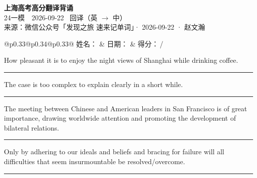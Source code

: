 \documentclass[11pt,a4paper]{article}
\newcommand{\num}[1]{\makebox[1.9em][r]{#1.}\hspace{0.3em}}
\newcommand{\wline}{\noindent\rule{\linewidth}{0.4pt}}
\begin{document}
\pagestyle{plain}
\begin{center}
{\LARGE\bfseries 上海高考高分翻译背诵 }\\[0.25em]
{\large 24一模　2026-09-22 \quad\ 回译（英 $\to$ 中）}\\[0.35em]
{\footnotesize 来源：微信公众号「发现之旅 速来记单词」· 2026-09-22 · 赵文瀚}
\end{center}

\vspace{0.4em}
\noindent\begin{tabular}{@{}p{0.33\textwidth}@{}p{0.34\textwidth}@{}p{0.33\textwidth}@{}}
姓名：\underline{\hspace{2.0cm}} & 日期：\underline{\hspace{2.0cm}} & 得分：\underline{\hspace{1.4cm}}\,/ \\
\end{tabular}

\vspace{0.5em}

\vspace{0.8em}
\num{1}How pleasant it is to enjoy the night views of Shanghai while drinking coffee.

\vspace{0.25em}

\wline

\num{2}The case is too complex to explain clearly in a short while.

\vspace{0.25em}

\wline

\num{3}The meeting between Chinese and American leaders in San Francisco is of great importance, drawing worldwide attention and promoting the development of bilateral relations.

\vspace{0.25em}

\wline

\num{4}Only by adhering to our ideals and beliefs and bracing for failure will all difficulties that seem insurmountable be resolved/overcome.

\vspace{0.25em}

\wline
\end{document}
